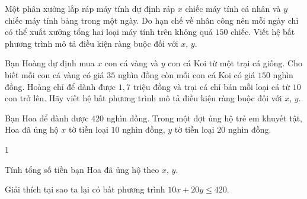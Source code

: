 \begin{bt}%
	Một phân xưởng lắp ráp máy tính dự định ráp $x$ chiếc máy tính cá nhân và $y$ chiếc máy tính bảng trong một ngày. Do hạn chế về nhân công nên mỗi ngày chỉ có thể xuất xưởng tổng hai loại máy tính trên không quá $150$ chiếc. Viết hệ bất phương trình mô tả điều kiện ràng buộc đối với $x$, $y$.
\end{bt}

\begin{bt}%
	Bạn Hoàng dự định mua $x$ con cá vàng và $y$ con cá Koi từ một trại cá giống. Cho biết mỗi con cá vàng có giá $35$ nghìn đồng còn mỗi con cá Koi có giá $150$ nghìn đồng. Hoàng chỉ để dành được $1{,}7$ triệu đồng và trại cá chỉ bán mỗi loại cá từ $10$ con trở lên. Hãy viết hệ bất phương trình mô tả điều kiện ràng buộc đối với $x$, $y$.
\end{bt}

\begin{bt}%
	Bạn Hoa để dành được $420$ nghìn đồng. Trong một đợt ủng hộ trẻ em khuyết tật, Hoa đã ủng hộ $x$ tờ tiền loại $10$ nghìn đồng, $y$ tờ tiền loại $20$ nghìn đồng.
	\begin{enumEX}{1}
		\item Tính tổng số tiền bạn Hoa đã ủng hộ theo $x$, $y$.
		\item Giải thích tại sao ta lại có bất phương trình $10x+20y \leq 420$.
	\end{enumEX}
\end{bt}

